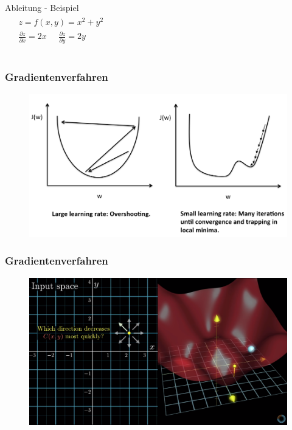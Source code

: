 \begin{frame}
\begin{columns}
\begin{block}{Ableitung - Beispiel}
\begin{align*}
\begin{aligned}
& z = f(x, y) = x^2 + y^2 \\
& \frac{\partial z}{\partial x} = 2x \;\;\;\;\; \frac{\partial z}{\partial y} = 2y 
\end{aligned}
\end{align*}
\end{block}

\end{columns}



\end{frame}


\begin{frame}
\frametitle{Gradientenverfahren}

\begin{figure}
\includegraphics[width=\linewidth]{./geschichtliches/adeline/img/adeline_learning_rate_alpha}
\end{figure}

\end{frame}


\begin{frame}
\frametitle{Gradientenverfahren}
\begin{figure}
\includegraphics[width=\linewidth]{./geschichtliches/adeline/img/3dPlot_1}
\end{figure}
\end{frame}



